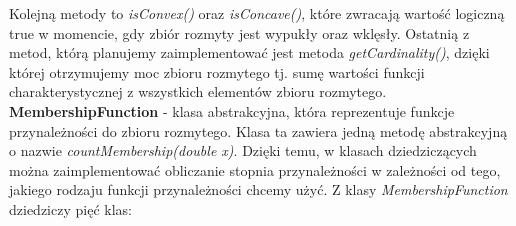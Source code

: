 \documentclass{classrep}
\begin{document}
Kolejną metody to \textit{isConvex()} oraz \textit{isConcave()}, które zwracają wartość logiczną true w momencie, gdy zbiór rozmyty jest wypukły oraz wklęsły. Ostatnią z metod, którą planujemy zaimplementować jest metoda \textit{getCardinality()}, dzięki której otrzymujemy moc zbioru rozmytego tj. sumę wartości funkcji charakterystycznej z wszystkich elementów zbioru rozmytego. \cite{niewiadomski08}\\
{\bf MembershipFunction} - klasa abstrakcyjna, która reprezentuje funkcje przynależności do zbioru rozmytego. Klasa ta zawiera jedną metodę abstrakcyjną o nazwie \textit{countMembership(double x)}. Dzięki temu, w klasach dziedziczących można zaimplementować obliczanie stopnia przynależności w zależności od tego, jakiego rodzaju funkcji przynależności chcemy użyć. \cite{uml_doc} 
Z klasy \textit{MembershipFunction} dziedziczy pięć klas:
\end{document}
